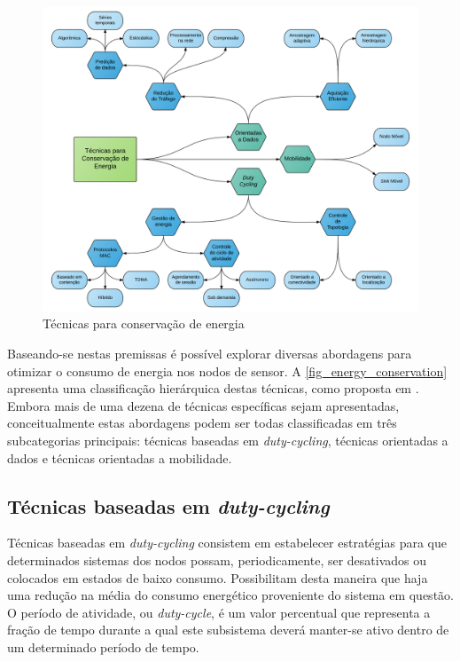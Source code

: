\documentclass[
	12pt,				%
	openright,			%
	oneside,
	a4paper,			%
	english,			%
	french,				%
	spanish,			%
	brazil				%
	]{abntex2}
\begin{document}
\begin{figure}[htb]
	\caption{\label{fig_energy_conservation}Técnicas para conservação de energia}
	\begin{center}
		\includegraphics[width=\linewidth]{EnergyConservation}
	\end{center}
\end{figure}

Baseando-se nestas premissas é possível explorar diversas abordagens para otimizar o consumo de energia nos nodos de sensor. A \autoref{fig_energy_conservation} apresenta uma classificação hierárquica destas técnicas, como proposta em \cite{Anastasi2009}. Embora mais de uma dezena de técnicas específicas sejam apresentadas, conceitualmente estas abordagens podem ser todas classificadas em três subcategorias principais: técnicas baseadas em \textit{duty-cycling}, técnicas orientadas a dados e técnicas orientadas a mobilidade.

\subsection{Técnicas baseadas em \textit{duty-cycling}}

Técnicas baseadas em \textit{duty-cycling} consistem em estabelecer estratégias para que determinados sistemas dos nodos possam, periodicamente, ser desativados ou colocados em estados de baixo consumo. Possibilitam desta maneira que haja uma redução na média do consumo energético proveniente do sistema em questão. O período de atividade, ou \textit{duty-cycle}, é um valor percentual que representa a fração de tempo durante a qual este subsistema deverá manter-se ativo dentro de um determinado período de tempo.
\end{document}
